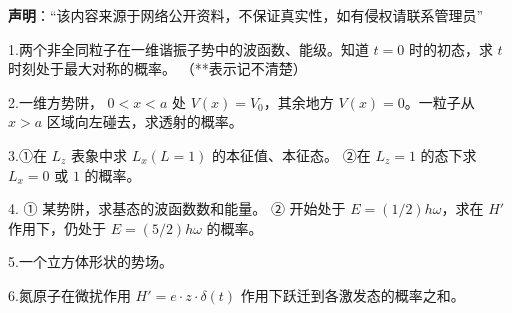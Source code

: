 
\textbf{声明}：“该内容来源于网络公开资料，不保证真实性，如有侵权请联系管理员”


1.两个非全同粒子在一维谐振子势中的波函数、能级。知道 $t = 0$ 时的初态，求 $t$ 时刻处于最大对称的概率。 （**表示记不清楚）

2.一维方势阱， $0 < x < a$ 处 $V(x) = V_0$，其余地方 $V(x) = 0$。一粒子从 $x > a$ 区域向左碰去，求透射的概率。


3.①在 $L_z$ 表象中求 $L_x (L = 1)$ 的本征值、本征态。
②在 $L_z = 1$ 的态下求 $L_x = 0$ 或 $1$ 的概率。

4. ① 某势阱，求基态的波函数数和能量。 ② 开始处于 $E = (1/2) h \omega$，求在 $H'$ 作用下，仍处于 $E = (5/2) h \omega$ 的概率。

5.一个立方体形状的势场。

6.氮原子在微扰作用 $H' = e \cdot z \cdot \delta(t)$ 作用下跃迁到各激发态的概率之和。